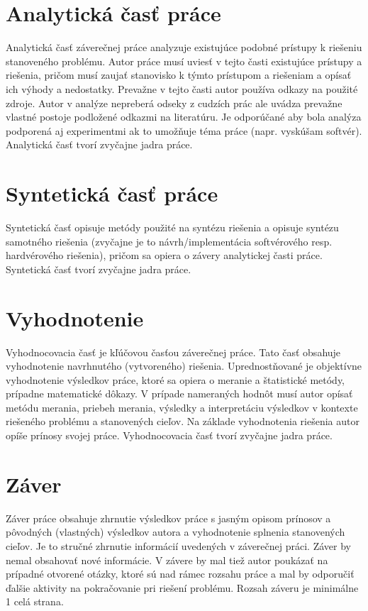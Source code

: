 \section{Analytická časť práce}

Analytická časť záverečnej práce analyzuje existujúce podobné prístupy k riešeniu stanoveného problému. Autor práce musí uviesť v tejto časti existujúce prístupy a riešenia, pričom musí zaujať stanovisko k týmto prístupom a riešeniam a opísať ich výhody a nedostatky. Prevažne v tejto časti autor používa odkazy na použité zdroje. Autor v analýze nepreberá odseky z cudzích prác ale uvádza prevažne vlastné postoje podložené odkazmi na literatúru. Je odporúčané aby bola analýza podporená aj experimentmi ak to umožňuje téma práce (napr. vyskúšam softvér). Analytická časť tvorí zvyčajne  jadra práce.

\section{Syntetická časť práce}

Syntetická časť opisuje metódy použité na syntézu riešenia a opisuje syntézu samotného riešenia (zvyčajne je to návrh/implementácia softvérového resp. hardvérového riešenia), pričom sa opiera o závery analytickej časti práce. Syntetická časť tvorí zvyčajne  jadra práce.

\section{Vyhodnotenie}

Vyhodnocovacia časť je kľúčovou časťou záverečnej práce. Tato časť obsahuje vyhodnotenie navrhnutého (vytvoreného) riešenia. Uprednostňované je objektívne vyhodnotenie výsledkov práce, ktoré sa opiera o meranie a štatistické metódy, prípadne matematické dôkazy. V prípade nameraných hodnôt musí autor opísať metódu merania, priebeh merania, výsledky a interpretáciu výsledkov v kontexte riešeného problému a stanovených cieľov. Na základe vyhodnotenia riešenia autor opíše prínosy svojej práce. Vyhodnocovacia časť tvorí zvyčajne  jadra práce.

\section{Záver}

Záver práce obsahuje zhrnutie výsledkov práce s jasným opisom prínosov a pôvodných (vlastných) výsledkov autora a vyhodnotenie splnenia stanovených cieľov. Je to stručné zhrnutie informácií uvedených v záverečnej práci. Záver by nemal obsahovať nové informácie. V závere by mal tiež autor poukázať na prípadné otvorené otázky, ktoré sú nad rámec rozsahu práce a mal by odporučiť ďalšie aktivity na pokračovanie pri riešení problému. Rozsah záveru je minimálne 1 celá strana.


